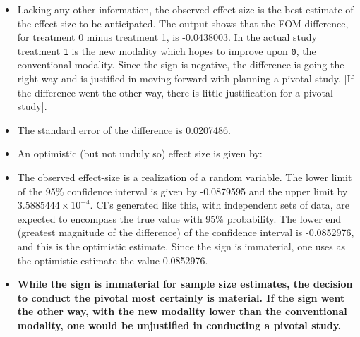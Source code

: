\documentclass[
]{book}
\newenvironment{Shaded}{\begin{snugshade}}{\end{snugshade}}
\newcommand{\DecValTok}[1]{\textcolor[rgb]{0.00,0.00,0.81}{#1}}
\newcommand{\KeywordTok}[1]{\textcolor[rgb]{0.13,0.29,0.53}{\textbf{#1}}}
\newcommand{\NormalTok}[1]{#1}
\newcommand{\OperatorTok}[1]{\textcolor[rgb]{0.81,0.36,0.00}{\textbf{#1}}}
\newcommand{\StringTok}[1]{\textcolor[rgb]{0.31,0.60,0.02}{#1}}
\begin{document}
\begin{itemize}
\item
  Lacking any other information, the observed effect-size is the best estimate of the effect-size to be anticipated. The output shows that the FOM difference, for treatment 0 minus treatment 1, is -0.0438003. In the actual study treatment \texttt{1} is the new modality which hopes to improve upon \texttt{0}, the conventional modality. Since the sign is negative, the difference is going the right way and is justified in moving forward with planning a pivotal study. {[}If the difference went the other way, there is little justification for a pivotal study{]}.
\item
  The standard error of the difference is 0.0207486.
\item
  An optimistic (but not unduly so) effect size is given by:
\end{itemize}

\begin{Shaded}
\end{Shaded}

\begin{itemize}
\item
  The observed effect-size is a realization of a random variable. The lower limit of the 95\% confidence interval is given by -0.0879595 and the upper limit by \ensuremath{3.5885444\times 10^{-4}}. CI's generated like this, with independent sets of data, are expected to encompass the true value with 95\% probability. The lower end (greatest magnitude of the difference) of the confidence interval is -0.0852976, and this is the optimistic estimate. Since the sign is immaterial, one uses as the optimistic estimate the value 0.0852976.
\item
  \textbf{While the sign is immaterial for sample size estimates, the decision to conduct the pivotal most certainly is material. If the sign went the other way, with the new modality lower than the conventional modality, one would be unjustified in conducting a pivotal study.}
\end{itemize}
\end{document}
